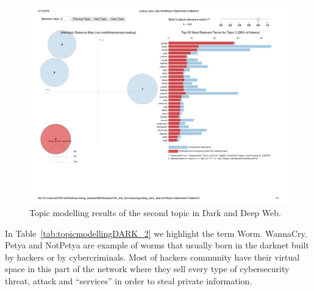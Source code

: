 \begin{figure}[h!]
\begin{center}
\includegraphics[scale=0.5]{./img/DARKDEEP_topic2.pdf}
\end{center}
\caption{Topic modelling results of the second topic in Dark and Deep Web.}
\label{fig:topicmodellingDARK_2}
\end{figure}

In Table~\ref{tab:topicmodellingDARK_2} we highlight the term Worm. WannaCry, Petya and NotPetya are example of worms that usually born in the darknet built by hackers or by cybercriminals. Most of hackers community have their virtual space in this part of the network where they sell every type of cybersecurity threat, attack and ``services'' in order to steal private information.



\begin{table}[h!]
\caption{Topic analysis results of the third topic for Dark and Deep Web.}
\label{tab:topicmodellingDARK_3}
\end{table}




